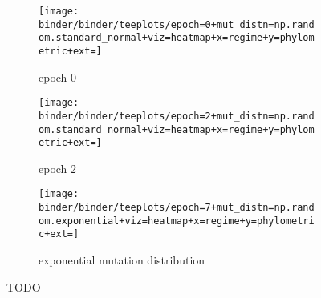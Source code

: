 \begin{figure*}
  \centering
  \begin{subfigure}[b]{\textwidth}
    \centering
    \texttt{[image: binder/binder/teeplots/epoch=0+mut\_distn=np.random.standard\_normal+viz=heatmap+x=regime+y=phylometric+ext=]}
    \caption{epoch 0}
    \label{fig:perfect-tree-phylometrics-heatmap-sensitivity-analysis:epoch0}
  \end{subfigure}
  \begin{subfigure}[b]{\textwidth}
    \centering
    \texttt{[image: binder/binder/teeplots/epoch=2+mut\_distn=np.random.standard\_normal+viz=heatmap+x=regime+y=phylometric+ext=]}
    \caption{epoch 2}
    \label{fig:perfect-tree-phylometrics-heatmap-sensitivity-analysis:epoch2}
  \end{subfigure}
  \begin{subfigure}[b]{\textwidth}
    \centering
    \texttt{[image: binder/binder/teeplots/epoch=7+mut\_distn=np.random.exponential+viz=heatmap+x=regime+y=phylometric+ext=]}
    \caption{exponential mutation distribution}
    \label{fig:perfect-tree-phylometrics-heatmap-sensitivity-analysis:exponential}
  \end{subfigure}
  \caption{TODO}
  \label{fig:perfect-tree-phylometrics-heatmap-sensitivity-analysis}
\end{figure*}
